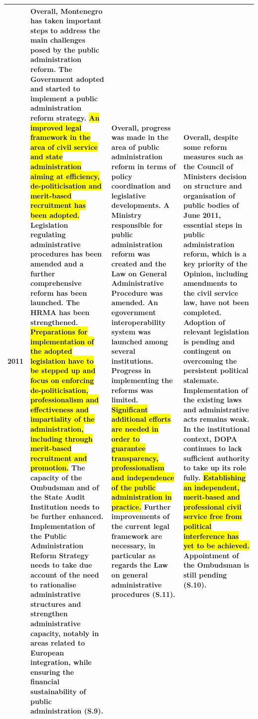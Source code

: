 \begin{longtable}[H]{|p{1cm}|L{45mm}|L{45mm}|L{45mm}|}
2011&\scriptsize{
Overall, Montenegro has taken important steps to address the main challenges posed by the public administration reform. The Government adopted and started to implement a public administration reform strategy. \hl{An improved legal framework in the area of civil service and state administration aiming at efficiency, de-politicisation and merit-based recruitment has been adopted.} Legislation regulating administrative procedures has been amended and a further comprehensive reform has been launched. The HRMA has been strengthened. \hl{Preparations for implementation of the adopted legislation have to be stepped up and focus on enforcing de-politicisation, professionalism and effectiveness and impartiality of the administration, including through merit-based recruitment and promotion.} The capacity of the Ombudsman and of the State Audit Institution needs to be further enhanced. Implementation of the Public Administration Reform Strategy needs to take due account of the need to rationalise administrative structures and strengthen administrative capacity, notably in areas related to European integration, while ensuring the financial sustainability of public administration (S.9).}&\scriptsize{
Overall, progress was made in the area of public administration reform in terms of policy coordination and legislative developments. A Ministry responsible for public administration reform was created and the Law on General Administrative Procedure was amended. An egovernment interoperability system was launched among several institutions. Progress in implementing the reforms was limited. \hl{Significant additional efforts are needed in order to guarantee transparency, professionalism and independence of the public administration in practice.} Further improvements of the current legal framework are necessary, in particular as regards the Law on general administrative procedures (S.11).}&\scriptsize{
Overall, despite some reform measures such as the Council of Ministers decision on structure and organisation of public bodies of June 2011, essential steps in public administration reform, which is a key priority of the Opinion, including amendments to the civil service law, have not been completed. Adoption of relevant legislation is pending and contingent on overcoming the persistent political stalemate. Implementation of the existing laws and administrative acts remains weak. In the institutional context, DOPA continues to lack sufficient authority to take up its role fully. \hl{Establishing an independent, merit-based and professional civil service free from political interference has yet to be achieved.} Appointment of the Ombudsman is still pending (S.10).}\\\hline

\end{longtable}
